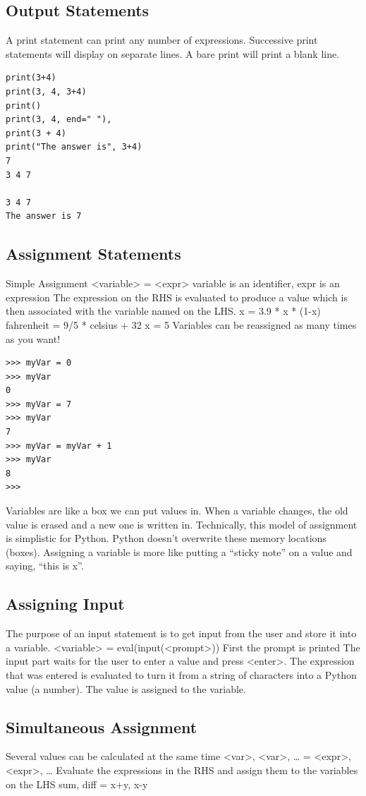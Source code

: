 \documentclass[12pt,a4paper,final,twoside,titlepage]{book}
\begin{document}
\subsection{Output Statements}
A print statement can print any number of expressions. Successive print statements will display on separate lines. A bare print will print a blank line.
\lstset{language=Python, tabsize=4}
\begin{lstlisting}
print(3+4)
print(3, 4, 3+4)
print()
print(3, 4, end=" "),
print(3 + 4)
print("The answer is", 3+4)
7
3 4 7

3 4 7
The answer is 7
\end{lstlisting}

\subsection{Assignment Statements}
Simple Assignment
<variable> = <expr>
variable is an identifier, expr is an expression
The expression on the RHS is evaluated to produce a value which is then associated with the variable named on the LHS.
x = 3.9 * x * (1-x)
fahrenheit = 9/5 * celsius + 32
x = 5
Variables can be reassigned as many times as you want!
\lstset{language=Python, tabsize=4}
\begin{lstlisting}
>>> myVar = 0
>>> myVar
0
>>> myVar = 7
>>> myVar
7
>>> myVar = myVar + 1
>>> myVar
8
>>> 
\end{lstlisting}
Variables are like a box we can put values in. When a variable changes, the old value is erased and a new one is written in. Technically, this model of assignment is simplistic for Python. Python doesn't overwrite these memory locations (boxes). Assigning a variable is more like putting a “sticky note” on a value and saying, “this is x”.
\subsection{Assigning Input}
The purpose of an input statement is to get input from the user and store it into a variable.
<variable> = eval(input(<prompt>))
First the prompt is printed The input part waits for the user to enter a value and press <enter>. The expression that was entered is evaluated to turn it from a string of characters into a Python value (a number). The value is assigned to the variable.
\subsection{Simultaneous Assignment}
Several values can be calculated at the same time
<var>, <var>, … = <expr>, <expr>, …
Evaluate the expressions in the RHS and assign them to the variables on the LHS
sum, diff = x+y, x-y
\end{document}
